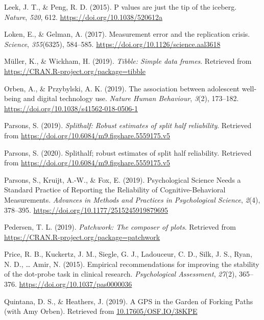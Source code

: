 \documentclass[
  english,
  man,floatsintext]{apa6}
\begin{document}
\leavevmode\hypertarget{ref-leek_p_2015}{}%
Leek, J. T., \& Peng, R. D. (2015). P values are just the tip of the iceberg. \emph{Nature}, \emph{520}, 612. \url{https://doi.org/10.1038/520612a}

\leavevmode\hypertarget{ref-loken_measurement_2017}{}%
Loken, E., \& Gelman, A. (2017). Measurement error and the replication crisis. \emph{Science}, \emph{355}(6325), 584--585. \url{https://doi.org/10.1126/science.aal3618}

\leavevmode\hypertarget{ref-R-tibble}{}%
Müller, K., \& Wickham, H. (2019). \emph{Tibble: Simple data frames}. Retrieved from \url{https://CRAN.R-project.org/package=tibble}

\leavevmode\hypertarget{ref-orben_association_2019}{}%
Orben, A., \& Przybylski, A. K. (2019). The association between adolescent well-being and digital technology use. \emph{Nature Human Behaviour}, \emph{3}(2), 173--182. \url{https://doi.org/10.1038/s41562-018-0506-1}

\leavevmode\hypertarget{ref-parsons_splithalf:_2019}{}%
Parsons, S. (2019). \emph{Splithalf: Robust estimates of split half reliability}. Retrieved from \url{https://doi.org/10.6084/m9.figshare.5559175.v5}

\leavevmode\hypertarget{ref-R-splithalf}{}%
Parsons, S. (2020). Splithalf; robust estimates of split half reliability. Retrieved from \url{https://doi.org/10.6084/m9.figshare.5559175.v5}

\leavevmode\hypertarget{ref-parsons_psychological_2019}{}%
Parsons, S., Kruijt, A.-W., \& Fox, E. (2019). Psychological Science Needs a Standard Practice of Reporting the Reliability of Cognitive-Behavioral Measurements. \emph{Advances in Methods and Practices in Psychological Science}, \emph{2}(4), 378--395. \url{https://doi.org/10.1177/2515245919879695}

\leavevmode\hypertarget{ref-R-patchwork}{}%
Pedersen, T. L. (2019). \emph{Patchwork: The composer of plots}. Retrieved from \url{https://CRAN.R-project.org/package=patchwork}

\leavevmode\hypertarget{ref-price_empirical_2015}{}%
Price, R. B., Kuckertz, J. M., Siegle, G. J., Ladouceur, C. D., Silk, J. S., Ryan, N. D., \ldots{} Amir, N. (2015). Empirical recommendations for improving the stability of the dot-probe task in clinical research. \emph{Psychological Assessment}, \emph{27}(2), 365--376. \url{https://doi.org/10.1037/pas0000036}

\leavevmode\hypertarget{ref-quintana_gps_2019}{}%
Quintana, D. S., \& Heathers, J. (2019). A GPS in the Garden of Forking Paths (with Amy Orben). Retrieved from \url{10.17605/OSF.IO/38KPE}
\end{document}
